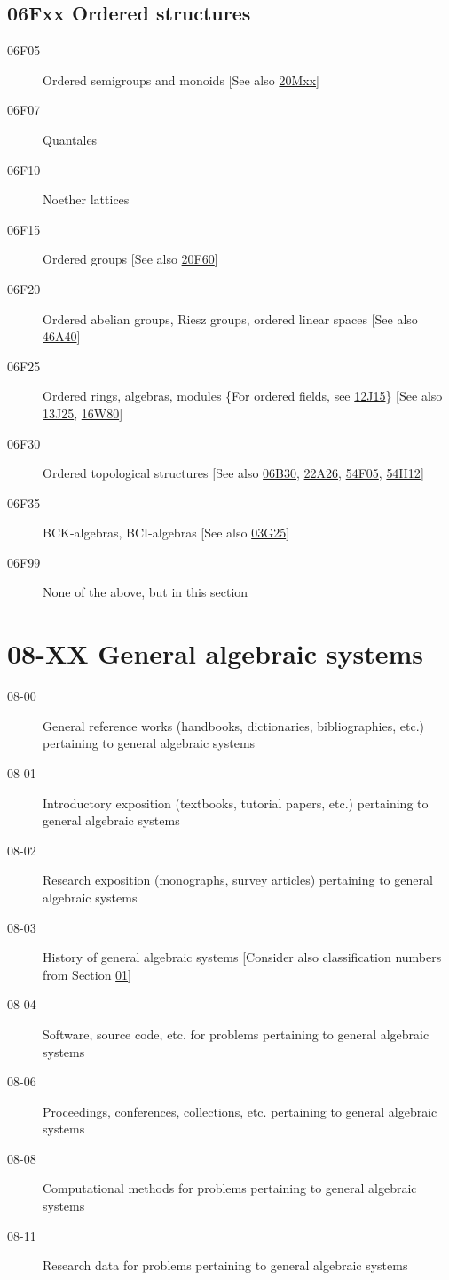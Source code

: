 \documentclass[letterpaper]{article}
\begin{document}
\subsection*{06Fxx  Ordered structures }\label{06Fxx}
\begin{description}  
\item [06F05]\label{06F05} Ordered semigroups and monoids [See also \hyperref[20Mxx]{20Mxx}]
\item [06F07]\label{06F07} Quantales
\item [06F10]\label{06F10} Noether lattices
\item [06F15]\label{06F15} Ordered groups [See also \hyperref[20F60]{20F60}]
\item [06F20]\label{06F20} Ordered abelian groups, Riesz groups, ordered linear spaces [See also \hyperref[46A40]{46A40}]
\item [06F25]\label{06F25} Ordered rings, algebras, modules \{For ordered fields, see \hyperref[12J15]{12J15}\} [See also \hyperref[13J25]{13J25}, \hyperref[16W80]{16W80}]
\item [06F30]\label{06F30} Ordered topological structures [See also \hyperref[06B30]{06B30}, \hyperref[22A26]{22A26}, \hyperref[54F05]{54F05}, \hyperref[54H12]{54H12}]
\item [06F35]\label{06F35} BCK-algebras, BCI-algebras [See also \hyperref[03G25]{03G25}]
\item [06F99]\label{06F99} None of the above, but in this section
\end{description}
\section*{08-XX General algebraic systems }\label{08-XX}
\begin{description}
\item [08-00]\label{08-00} General reference works (handbooks, dictionaries, bibliographies, etc.) pertaining to general algebraic systems
\item [08-01]\label{08-01} Introductory exposition (textbooks, tutorial papers, etc.) pertaining to general algebraic systems
\item [08-02]\label{08-02} Research exposition (monographs, survey articles) pertaining to general algebraic systems
\item [08-03]\label{08-03} History of general algebraic systems [Consider also classification numbers from Section \hyperref[01-XX]{01}]
\item [08-04]\label{08-04} Software, source code, etc. for problems pertaining to general algebraic systems
\item [08-06]\label{08-06} Proceedings, conferences, collections, etc. pertaining to general algebraic systems
\item [08-08]\label{08-08} Computational methods for problems pertaining to general algebraic systems
\item [08-11]\label{08-11} Research data for problems pertaining to general algebraic systems
\end{description}
\end{document}
